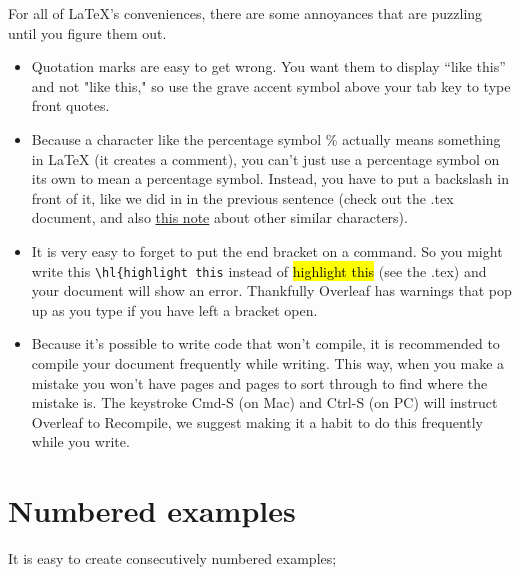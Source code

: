 \documentclass{article}
\begin{document}
For all of \LaTeX{}'s conveniences, there are some annoyances that are puzzling until you figure them out. 

\begin{itemize}

    \item Quotation marks are easy to get wrong. You want them to display ``like this'' and not "like this," so use the grave accent symbol above your tab key to type front quotes. 

    \item Because a character like the percentage symbol \% actually means something in \LaTeX{} (it creates a comment), you can't just use a percentage symbol on its own to mean a percentage symbol. Instead, you have to put a backslash in front of it, like we did in in the previous sentence (check out the .tex document, and also \href{http://ptmartins.info/latex/#special-characters}{this note} about other similar characters).
    
    \item It is very easy to forget to put the end bracket on a command. So you might write this \verb|\hl{highlight this| instead of \hl{highlight this} (see the .tex) and your document will show an error. Thankfully Overleaf has warnings that pop up as you type if you have left a bracket open.
    
    \item Because it's possible to write code that won't compile, it is recommended to compile your document frequently while writing. This way, when you make a mistake you won't have pages and pages to sort through to find where the mistake is. The keystroke Cmd-S (on Mac) and Ctrl-S (on PC) will instruct Overleaf to Recompile, we suggest making it a habit to do this frequently while you write. %

\end{itemize}

\section{Numbered examples} \label{SectNumberedExs}

It is easy to create consecutively numbered examples; 

\end{document}
